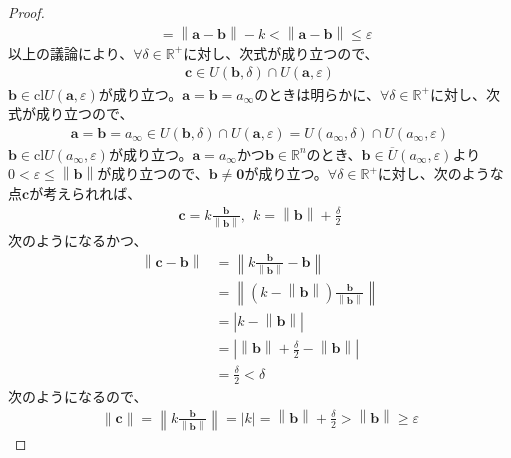\documentclass[dvipdfmx]{jsarticle}
\begin{document}
\begin{proof}
\begin{align*}
&= \left\| \mathbf{a} - \mathbf{b} \right\| - k < \left\| \mathbf{a - b} \right\| \leq \varepsilon
\end{align*}
以上の議論により、$\forall\delta \in \mathbb{R}^{+}$に対し、次式が成り立つので、
\begin{align*}
\mathbf{c} \in U\left( \mathbf{b},\delta \right) \cap U\left( \mathbf{a},\varepsilon \right)
\end{align*}
$\mathbf{b} \in \mathrm{cl}{U\left( \mathbf{a},\varepsilon \right)}$が成り立つ。$\mathbf{a} = \mathbf{b} = a_{\infty}$のときは明らかに、$\forall\delta \in \mathbb{R}^{+}$に対し、次式が成り立つので、
\begin{align*}
\mathbf{a} = \mathbf{b} = a_{\infty} \in U\left( \mathbf{b},\delta \right) \cap U\left( \mathbf{a},\varepsilon \right) = U\left( a_{\infty},\delta \right) \cap U\left( a_{\infty},\varepsilon \right)
\end{align*}
$\mathbf{b} \in \mathrm{cl}{U\left( a_{\infty},\varepsilon \right)}$が成り立つ。$\mathbf{a} = a_{\infty}$かつ$\mathbf{b} \in \mathbb{R}^{n}$のとき、$\mathbf{b} \in \overline{U}\left( a_{\infty},\varepsilon \right)$より$0 < \varepsilon \leq \left\| \mathbf{b} \right\|$が成り立つので、$\mathbf{b} \neq \mathbf{0}$が成り立つ。$\forall\delta \in \mathbb{R}^{+}$に対し、次のような点$\mathbf{c}$が考えられれば、
\begin{align*}
\mathbf{c} = k\frac{\mathbf{b}}{\left\| \mathbf{b} \right\|},\ \ k = \left\| \mathbf{b} \right\| + \frac{\delta}{2}
\end{align*}
次のようになるかつ、
\begin{align*}
\left\| \mathbf{c} - \mathbf{b} \right\| &= \left\| k\frac{\mathbf{b}}{\left\| \mathbf{b} \right\|} - \mathbf{b} \right\|\\
&= \left\| \left( k - \left\| \mathbf{b} \right\| \right)\frac{\mathbf{b}}{\left\| \mathbf{b} \right\|} \right\|\\
&= \left| k - \left\| \mathbf{b} \right\| \right|\\
&= \left| \left\| \mathbf{b} \right\| + \frac{\delta}{2} - \left\| \mathbf{b} \right\| \right|\\
&= \frac{\delta}{2} < \delta
\end{align*}
次のようになるので、
\begin{align*}
\left\| \mathbf{c} \right\| = \left\| k\frac{\mathbf{b}}{\left\| \mathbf{b} \right\|} \right\| = |k| = \left\| \mathbf{b} \right\| + \frac{\delta}{2} > \left\| \mathbf{b} \right\| \geq \varepsilon
\end{align*}

\end{proof}
\end{document}
